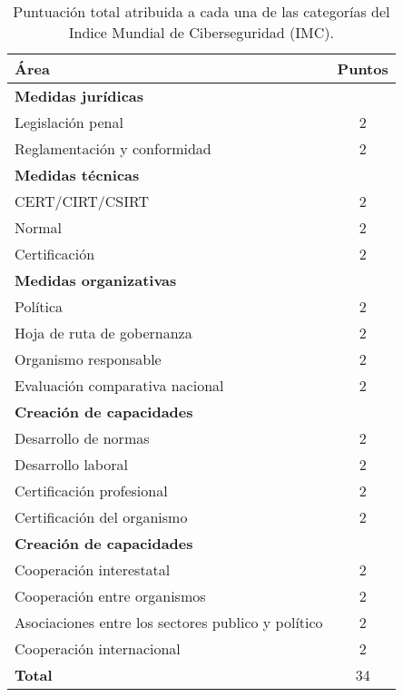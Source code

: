 \documentclass[runningheads,a4paper]{llncs}
\begin{document}
\begin{table}[ht]
\caption{Puntuación total atribuida a cada una de las categorías del Indice Mundial de Ciberseguridad (IMC).}
\begin{center}
\begin{tabular}{ | l | c |}

 \hline                 
   \textbf{Área} & \textbf{Puntos} \\ \hline \hline
   \textbf{Medidas jurídicas} &  \\
   Legislación penal & 2 \\
   Reglamentación y conformidad & 2 \\ \hline
   
   \textbf{Medidas técnicas} &  \\
   CERT/CIRT/CSIRT & 2 \\
   Normal & 2 \\
   Certificación & 2 \\ \hline
   
   \textbf{Medidas organizativas} &  \\
   Política & 2 \\
   Hoja de ruta de gobernanza & 2 \\
   Organismo responsable & 2 \\
   Evaluación comparativa nacional & 2 \\ \hline
   
   \textbf{Creación de capacidades} &  \\
   Desarrollo de normas & 2 \\
   Desarrollo laboral & 2 \\
   Certificación profesional & 2 \\
   Certificación del organismo & 2 \\ \hline
   
   \textbf{Creación de capacidades} &  \\
   Cooperación interestatal & 2 \\
   Cooperación entre organismos & 2 \\
   Asociaciones entre los sectores publico y político & 2 \\
   Cooperación internacional & 2 \\ \hline

   \textbf{Total} & 34 \\ \hline   
    
\hline  
\end{tabular}
\end{center}
\label{table:pimc}
\end{table}
\end{document}
